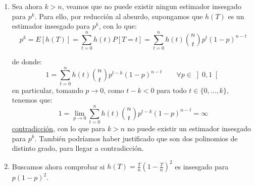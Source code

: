\begin{ejercicio}
\begin{enumerate}[label=\alph*)]
            Finalmente, como:
            \begin{equation*}
                E\left[{(h(T))}^{2}\right] = \sum_{t=0}^{n}{(h(t))}^{2}P[T=t] < \infty
            \end{equation*}
            y teníamos que $T$ era un estimador suficiente y completo (cuando vimos que $\{B(1,p) : p\in \left]0,1\right[\}$ era una familia exponencial), tenemos entonces que $E[h(T)/T] = h(T)$ es el UMVUE de $p^k$.
        \item Sea ahora $k>n$, veamos que no puede existir ningun estimador insesgado para $p^k$. Para ello, por reducción al absurdo, supongamos que $h(T)$ es un estimador insesgado para $p^k$, con lo que:
            \begin{equation*}
                p^k = E[h(T)] = \sum_{t=0}^{n}h(t)P[T=t] = \sum_{t=0}^{n}h(t)\binom{n}{t}p^t {(1-p)}^{n-t}
            \end{equation*}

            de donde:
            \begin{equation*}
                1 = \sum_{t=0}^{n}h(t)\binom{n}{t}p^{t-k} {(1-p)}^{n-t} \qquad \forall p \in \left]0,1\right[
            \end{equation*}
            en particular, tomando $p\to 0$, como $t-k < 0$ para todo $t \in \{0,\ldots,k\}$, tenemos que:
            \begin{equation*}
                1 = \lim_{p\to0} \sum_{t=0}^{n}h(t)\binom{n}{t}p^{t-k} {(1-p)}^{n-t} = \infty
            \end{equation*}
            \underline{contradicción}, con lo que para $k>n$ no puede existir un estimador insesgado para $p^k$. También podríamos haber justificado que son dos polinomios de distinto grado, para llegar a contradicción.
        \item Buscamos ahora comprobar si $h(T) = \frac{T}{n}{\left(1-\frac{T}{n}\right)}^{2}$ es insesgado para $p{(1-p)}^{2}$.


\end{enumerate}
\end{ejercicio}
